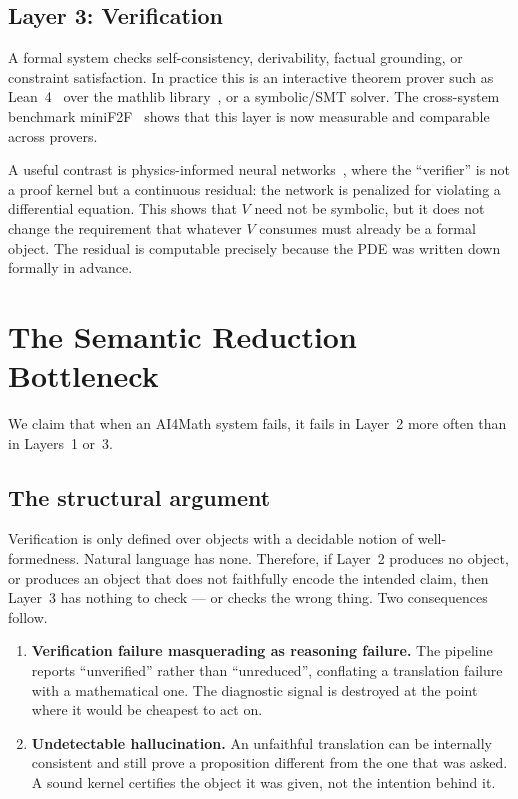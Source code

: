 \documentclass[11pt,a4paper]{article}
\begin{document}
\subsection{Layer 3: Verification}
A formal system checks self-consistency, derivability, factual grounding, or
constraint satisfaction.  In practice this is an interactive theorem prover such
as Lean~4~\cite{moura2021lean4} over the mathlib
library~\cite{mathlib2020}, or a symbolic/SMT solver.  The cross-system
benchmark miniF2F~\cite{zheng2022minif2f} shows that this layer is now
measurable and comparable across provers.

A useful contrast is physics-informed neural
networks~\cite{raissi2019pinn}, where the ``verifier'' is not a proof kernel but
a continuous residual: the network is penalized for violating a differential
equation.  This shows that $V$ need not be symbolic, but it does not change the
requirement that whatever $V$ consumes must already be a formal object.  The
residual is computable precisely because the PDE was written down formally in
advance.

\section{The Semantic Reduction Bottleneck}
\label{sec:bottleneck}

We claim that when an AI4Math system fails, it fails in Layer~2 more often than
in Layers~1 or~3.

\subsection{The structural argument}
Verification is only defined over objects with a decidable notion of
well-formedness.  Natural language has none.  Therefore, if Layer~2 produces no
object, or produces an object that does not faithfully encode the intended
claim, then Layer~3 has nothing to check --- or checks the wrong thing.  Two
consequences follow.

\begin{enumerate}
  \item \textbf{Verification failure masquerading as reasoning failure.}  The
        pipeline reports ``unverified'' rather than ``unreduced'', conflating a
        translation failure with a mathematical one.  The diagnostic signal is
        destroyed at the point where it would be cheapest to act on.
  \item \textbf{Undetectable hallucination.}  An unfaithful translation can be
        internally consistent and still prove a proposition different from the
        one that was asked.  A sound kernel certifies the object it was given,
        not the intention behind it.
\end{enumerate}
\end{document}
